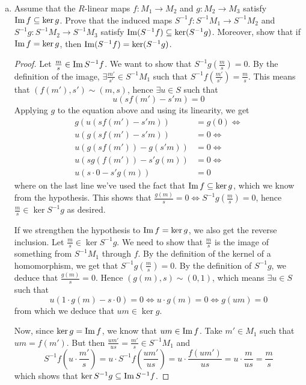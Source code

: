 \begin{problem*}{6}
\begin{enumerate}[(a)]
    \item Assume that the \(R\)-linear maps \(f \colon M_1 \to M_2\) and \(g \colon M_2 \to M_3\) satisfy \(\operatorname{Im} f \subseteq \ker g\). Prove that the induced maps \(S^{-1} f \colon S^{-1} M_1 \to S^{-1} M_2\) and \(S^{-1} g \colon S^{-1} M_2 \to S^{-1} M_3\) satisfy \(\operatorname{Im} (S^{-1} f) \subseteq \ker (S^{-1} g)\). Moreover, show that if \(\operatorname{Im} f = \ker g\), then \(\operatorname{Im} (S^{-1} f) = \ker (S^{-1} g)\).
    
    \begin{proof}
    Let \(\frac{m}{s} \in \operatorname{Im} S^{-1} f\). We want to show that \(S^{-1} g\left(\frac{m}{s}\right) = 0\). By the definition of the image, \(\exists \frac{m'}{s'} \in S^{-1} M_1\) such that \(S^{-1} f \left(\frac{m'}{s'}\right) = \frac{m}{s}\). This means that \((f(m'), s') \sim (m, s)\), hence \(\exists u \in S\) such that
    \[
        u(s f(m') - s' m) = 0
    \]
    Applying \(g\) to the equation above and using its linearity, we get
    \begin{align*}
        g(u(s f(m') - s' m)) &= g(0) \iff \\
        u(g(s f(m') - s' m)) &= 0 \iff \\
        u(g(s f(m')) - g(s' m)) &= 0 \iff \\
        u(s g (f(m')) - s' g (m)) &= 0 \iff \\
        u(s \cdot 0 - s' g (m)) &= 0
    \end{align*}
    where on the last line we've used the fact that \(\operatorname{Im} f \subseteq \ker g\), which we know from the hypothesis. This shows that \(\frac{g(m)}{s} = 0 \iff S^{-1} g \left(\frac{m}{s}\right) = 0\), hence \(\frac{m}{s} \in \ker S^{-1} g\) as desired.
    
    If we strengthen the hypothesis to \(\operatorname{Im} f = \ker g\), we also get the reverse inclusion. Let \(\frac{m}{s} \in \ker S^{-1} g\). We need to show that \(\frac{m}{s}\) is the image of something from \(S^{-1} M_1\) through \(f\). By the definition of the kernel of a homomorphism, we get that \(S^{-1} g\left(\frac{m}{s}\right) = 0\). By the definition of \(S^{-1} g\), we deduce that \(\frac{g(m)}{s} = 0\). Hence \((g(m), s) \sim (0,1)\), which means \(\exists u \in S\) such that
    \[
        u(1 \cdot g(m) - s \cdot 0) = 0 \iff
        u \cdot g(m) = 0 \iff
        g(um) = 0
    \]
    from which we deduce that \(um \in \ker g\).
    
    Now, since \(\ker g = \operatorname{Im} f\), we know that \(um \in \operatorname{Im} f\). Take \(m' \in M_1\) such that \(um = f(m')\). But then \(\frac{um'}{us} = \frac{m'}{s} \in S^{-1} M_1\) and
    \[
        S^{-1} f \left(u \cdot \frac{m'}{s}\right) = u \cdot S^{-1} f \left(\frac{um'}{us}\right) = u \cdot \frac{f(um')}{us} = u \cdot \frac{m}{us} = \frac{m}{s}
    \]
    which shows that \(\ker S^{-1} g \subseteq \operatorname{Im} S^{-1} f\).
    \end{proof}
\end{enumerate}
\end{problem*}
